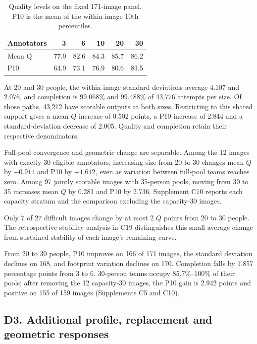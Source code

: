 \begin{table}[ht]
\centering\small
\caption{Quality levels on the fixed 171-image panel. P10 is the mean of the within-image 10th percentiles.}
\label{tab:d-size-levels}
\begin{tabular}{lrrrrr}
\toprule
Annotators & 3 & 6 & 10 & 20 & 30\\
\midrule
Mean Q & 77.9 & 82.6 & 84.3 & 85.7 & 86.2\\
P10 & 64.9 & 73.1 & 76.9 & 80.6 & 83.5\\
\bottomrule
\end{tabular}
\end{table}

At 20 and 30 people, the within-image standard deviations average 4.107 and 2.076, and completion is 99.068\% and 99.488\% of 43,776 attempts per size. Of those paths, 43,212 have scorable outputs at both sizes. Restricting to this shared support gives a mean $Q$ increase of 0.502 points, a P10 increase of 2.844 and a standard-deviation decrease of 2.005. Quality and completion retain their respective denominators.

Full-pool convergence and geometric change are separable. Among the 12 images with exactly 30 eligible annotators, increasing size from 20 to 30 changes mean $Q$ by $-0.911$ and P10 by $+1.612$, even as variation between full-pool teams reaches zero. Among 97 jointly scorable images with 35-person pools, moving from 30 to 35 increases mean $Q$ by 0.281 and P10 by 2.736. Supplement C10 reports each capacity stratum and the comparison excluding the capacity-30 images.

Only 7 of 27 difficult images change by at most 2 $Q$ points from 20 to 30 people. The retrospective stability analysis in C19 distinguishes this small average change from sustained stability of each image's remaining curve.

From 20 to 30 people, P10 improves on 166 of 171 images, the standard deviation declines on 168, and footprint variation declines on 170. Completion falls by 1.857 percentage points from 3 to 6. 30-person teams occupy 85.7\%--100\% of their pools; after removing the 12 capacity-30 images, the P10 gain is 2.942 points and positive on 155 of 159 images (Supplements C5 and C10).

\subsection*{D3. Additional profile, replacement and geometric responses}
\label{supp:d3-composition}


